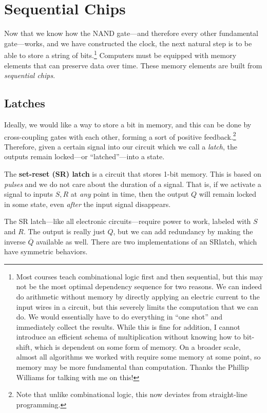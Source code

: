\section{Sequential Chips}

  Now that we know how the NAND gate---and therefore every other fundamental gate---works, and we have constructed the clock, the next natural step is to be able to store a string of bits.\footnote{Most courses teach combinational logic first and then sequential, but this may not be the most optimal dependency sequence for two reasons. We can indeed do arithmetic without memory by directly applying an electric current to the input wires in a circuit, but this severely limits the computation that we can do. We would essentially have to do everything in ``one shot'' and immediately collect the results. While this is fine for addition, I cannot introduce an efficient schema of multiplication without knowing how to bit-shift, which is dependent on some form of memory. On a broader scale, almost all algorithms we worked with require some memory at some point, so memory may be more fundamental than computation. Thanks the Phillip Williams for talking with me on this!} Computers must be equipped with memory elements that can preserve data over time. These memory elements are built from \textit{sequential chips}. 

\subsection{Latches}

  Ideally, we would like a way to store a bit in memory, and this can be done by cross-coupling gates with each other, forming a sort of positive feedback.\footnote{Note that unlike combinational logic, this now deviates from straight-line programming.} Therefore, given a certain signal into our circuit which we call a \textit{latch}, the outputs remain locked---or ``latched''---into a state. 

  \begin{definition}[SR Latch]
    The \textbf{set-reset (SR) latch} is a circuit that stores 1-bit memory. This is based on \textit{pulses} and we do not care about the duration of a signal. That is, if we activate a signal to inputs $S, R$ at \textit{any} point in time, then the output $Q$ will remain locked in some state, even \textit{after} the input signal disappears. 
  \end{definition}

  The SR latch---like all electronic circuits---require power to work, labeled with $S$ and $R$. The output is really just $Q$, but we can add redundancy by making the inverse $\overline{Q}$ available as well. There are two implementations of an SRlatch, which have symmetric behaviors. 

